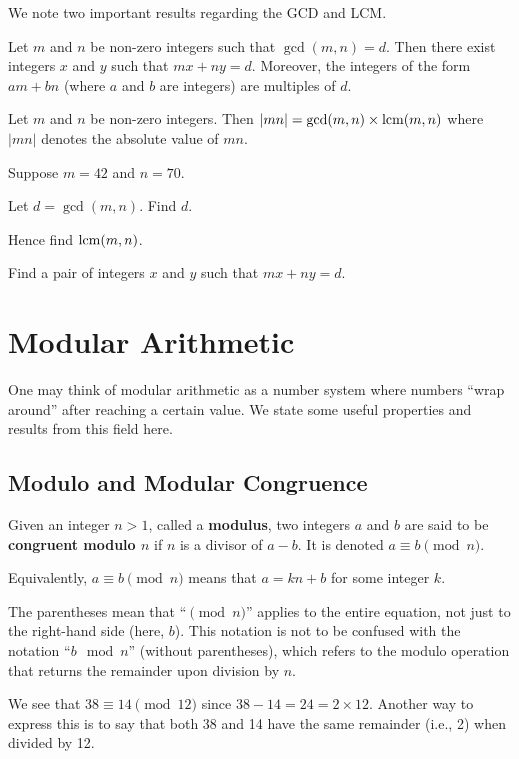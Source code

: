 We note two important results regarding the GCD and LCM.
\begin{lemma}[B\'{e}zout]\label{lemma-bezout}
    Let $m$ and $n$ be non-zero integers such that $\gcd(m, n) = d$. Then there exist integers $x$ and $y$ such that $mx + ny = d$. Moreover, the integers of the form $am + bn$ (where $a$ and $b$ are integers) are multiples of $d$.
\end{lemma}
\begin{proposition}\label{prop-product-of-gcd-and-lcm}
    Let $m$ and $n$ be non-zero integers. Then $|mn| = \gcd(m,n) \times \mathrm{lcm}(m,n)$ where $|mn|$ denotes the absolute value of $mn$.
\end{proposition}

\begin{exercise}
    Suppose $m = 42$ and $n = 70$.
    \begin{partquestions}{\roman*}
        \item Let $d = \gcd(m,n)$. Find $d$.
        \item Hence find $\mathrm{lcm}(m,n)$.
        \item Find a pair of integers $x$ and $y$ such that $mx + ny = d$.
    \end{partquestions}
\end{exercise}

\chapter{Modular Arithmetic}
One may think of modular arithmetic as a number system where numbers ``wrap around'' after reaching a certain value. We state some useful properties and results from this field here.

\section{Modulo and Modular Congruence}
\begin{definition}
    Given an integer $n>1$, called a \textbf{modulus}, two integers $a$ and $b$ are said to be \textbf{congruent modulo $n$} if $n$ is a divisor of $a - b$. It is denoted $a \equiv b \pmod{n}$.
\end{definition}
\begin{remark}
    Equivalently, $a \equiv b \pmod n$ means that $a = kn + b$ for some integer $k$.
\end{remark}
\begin{remark}
    The parentheses mean that ``$\pmod{n}$'' applies to the entire equation, not just to the right-hand side (here, $b$). This notation is not to be confused with the notation ``$b \mod n$'' (without parentheses), which refers to the modulo operation that returns the remainder upon division by $n$.
\end{remark}
\begin{example}
    We see that $38 \equiv 14 \pmod{12}$ since $38 - 14 = 24 = 2 \times 12$. Another way to express this is to say that both 38 and 14 have the same remainder (i.e., 2) when divided by 12.
\end{example}

